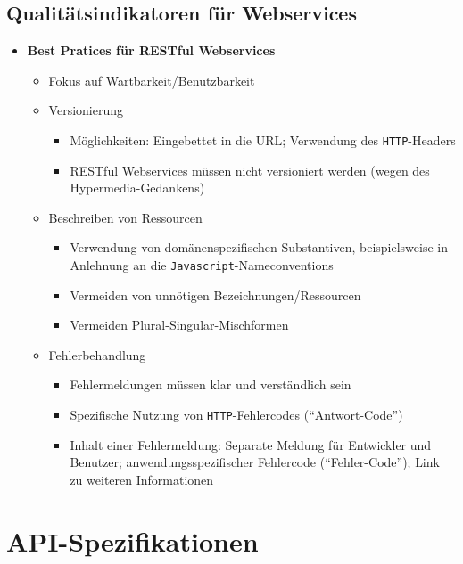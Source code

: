 \subsection{Qualitätsindikatoren für Webservices}
\begin{itemize}
	\item \textbf{Best Pratices für RESTful Webservices}
	\begin{itemize}
		\item Fokus auf Wartbarkeit/Benutzbarkeit
		\item Versionierung
		\begin{itemize}
			\item Möglichkeiten: Eingebettet in die URL; Verwendung des \texttt{HTTP}-Headers
			\item RESTful Webservices müssen nicht versioniert werden (wegen des Hypermedia-Gedankens)
		\end{itemize}
		\item Beschreiben von Ressourcen
		\begin{itemize}
			\item Verwendung von domänenspezifischen Substantiven, beispielsweise in Anlehnung an die \texttt{Javascript}-Nameconventions
			\item Vermeiden von unnötigen Bezeichnungen/Ressourcen
			\item Vermeiden Plural-Singular-Mischformen
		\end{itemize}
		\item Fehlerbehandlung
		\begin{itemize}
			\item Fehlermeldungen müssen klar und verständlich sein
			\item Spezifische Nutzung von \texttt{HTTP}-Fehlercodes ("`Antwort-Code"')
			\item Inhalt einer Fehlermeldung: Separate Meldung für Entwickler und Benutzer; anwendungsspezifischer Fehlercode ("`Fehler-Code"'); Link zu weiteren Informationen
		\end{itemize}
	\end{itemize}
\end{itemize}



\section{API-Spezifikationen}

